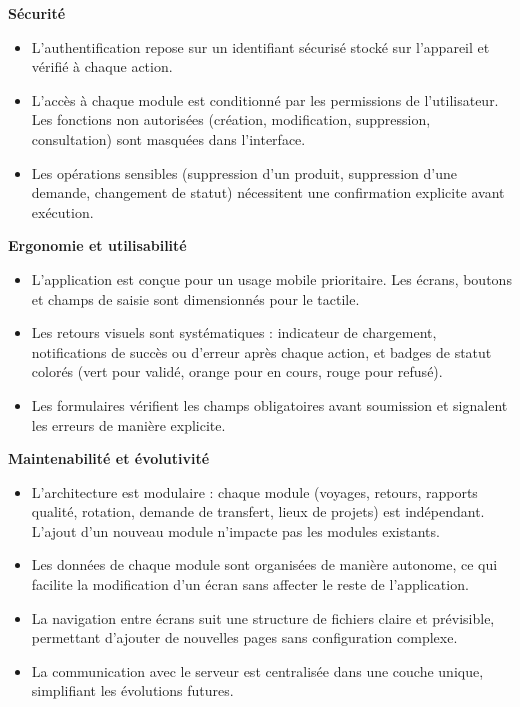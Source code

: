 \documentclass[12pt,a4paper]{article}
\begin{document}
    \vspace{0.8em}\textbf{Sécurité}\vspace{0.2em}
    \begin{itemize}[leftmargin=1.2em]
    \item L'authentification repose sur un identifiant sécurisé stocké sur l'appareil et vérifié à chaque action.
    \item L'accès à chaque module est conditionné par les permissions de l'utilisateur. Les fonctions non autorisées (création, modification, suppression, consultation) sont masquées dans l'interface.
    \item Les opérations sensibles (suppression d'un produit, suppression d'une demande, changement de statut) nécessitent une confirmation explicite avant exécution.
    \end{itemize}

    \vspace{0.8em}\textbf{Ergonomie et utilisabilité}\vspace{0.2em}
    \begin{itemize}[leftmargin=1.2em,topsep=0pt]
    \item L'application est conçue pour un usage mobile prioritaire. Les écrans, boutons et champs de saisie sont dimensionnés pour le tactile.
    \item Les retours visuels sont systématiques : indicateur de chargement, notifications de succès ou d'erreur après chaque action, et badges de statut colorés (vert pour validé, orange pour en cours, rouge pour refusé).
    \item Les formulaires vérifient les champs obligatoires avant soumission et signalent les erreurs de manière explicite.
    \end{itemize}

    \vspace{0.8em}\textbf{Maintenabilité et évolutivité}\vspace{0.2em}
    \begin{itemize}[leftmargin=1.2em,topsep=0pt]
    \item L'architecture est modulaire : chaque module (voyages, retours, rapports qualité, rotation, demande de transfert, lieux de projets) est indépendant. L'ajout d'un nouveau module n'impacte pas les modules existants.
    \item Les données de chaque module sont organisées de manière autonome, ce qui facilite la modification d'un écran sans affecter le reste de l'application.
    \item La navigation entre écrans suit une structure de fichiers claire et prévisible, permettant d'ajouter de nouvelles pages sans configuration complexe.
    \item La communication avec le serveur est centralisée dans une couche unique, simplifiant les évolutions futures.
    \end{itemize}
\end{document}
